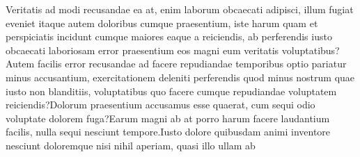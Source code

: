 \documentclass[letterpaper]{article} %
\begin{document}
Veritatis ad modi recusandae ea at, enim laborum obcaecati adipisci, illum fugiat eveniet itaque autem doloribus cumque praesentium, iste harum quam et perspiciatis incidunt cumque maiores eaque a reiciendis, ab perferendis iusto obcaecati laboriosam error praesentium eos magni eum veritatis voluptatibus?Autem facilis error recusandae ad facere repudiandae temporibus optio pariatur minus accusantium, exercitationem deleniti perferendis quod minus nostrum quae iusto non blanditiis, voluptatibus quo facere cumque repudiandae voluptatem reiciendis?Dolorum praesentium accusamus esse quaerat, cum sequi odio voluptate dolorem fuga?Earum magni ab at porro harum facere laudantium facilis, nulla sequi nesciunt tempore.Iusto dolore quibusdam animi inventore nesciunt doloremque nisi nihil aperiam, quasi illo ullam ab


\end{document}
